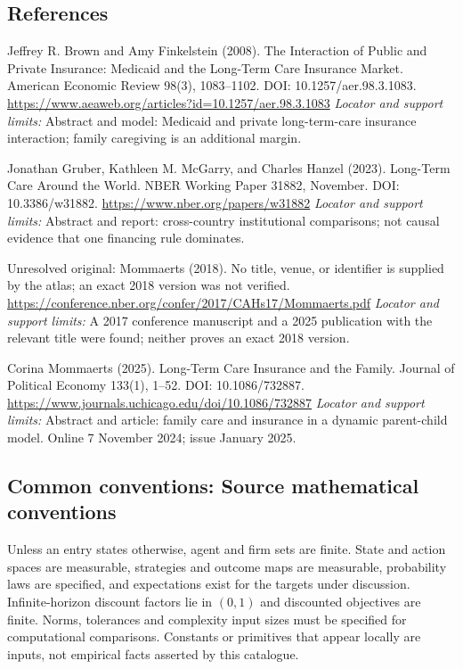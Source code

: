 \documentclass[11pt,a4paper]{article}
\begin{document}
\subsection*{References}
\begin{enumerate}[label={[S\arabic*]},leftmargin=*,itemsep=0.6em]
\item Jeffrey R. Brown and Amy Finkelstein (2008). The Interaction of Public and Private Insurance: Medicaid and the Long-Term Care Insurance Market. American Economic Review 98(3), 1083--1102. DOI: 10.1257/aer.98.3.1083.
\url{https://www.aeaweb.org/articles?id=10.1257/aer.98.3.1083}
\newline\emph{Locator and support limits:} Abstract and model: Medicaid and private long-term-care insurance interaction; family caregiving is an additional margin.
\item Jonathan Gruber, Kathleen M. McGarry, and Charles Hanzel (2023). Long-Term Care Around the World. NBER Working Paper 31882, November. DOI: 10.3386/w31882.
\url{https://www.nber.org/papers/w31882}
\newline\emph{Locator and support limits:} Abstract and report: cross-country institutional comparisons; not causal evidence that one financing rule dominates.
\item Unresolved original: Mommaerts (2018). No title, venue, or identifier is supplied by the atlas; an exact 2018 version was not verified.
\url{https://conference.nber.org/confer/2017/CAHs17/Mommaerts.pdf}
\newline\emph{Locator and support limits:} A 2017 conference manuscript and a 2025 publication with the relevant title were found; neither proves an exact 2018 version.
\item Corina Mommaerts (2025). Long-Term Care Insurance and the Family. Journal of Political Economy 133(1), 1--52. DOI: 10.1086/732887.
\url{https://www.journals.uchicago.edu/doi/10.1086/732887}
\newline\emph{Locator and support limits:} Abstract and article: family care and insurance in a dynamic parent-child model. Online 7 November 2024; issue January 2025.
\end{enumerate}

\subsection*{Common conventions: Source mathematical conventions}

Unless an entry states otherwise, agent and firm sets are finite. State and action spaces are measurable, strategies and outcome maps are measurable, probability laws are specified, and expectations exist for the targets under discussion. Infinite-horizon discount factors lie in $(0,1)$ and discounted objectives are finite. Norms, tolerances and complexity input sizes must be specified for computational comparisons. Constants or primitives that appear locally are inputs, not empirical facts asserted by this catalogue.
\end{document}
